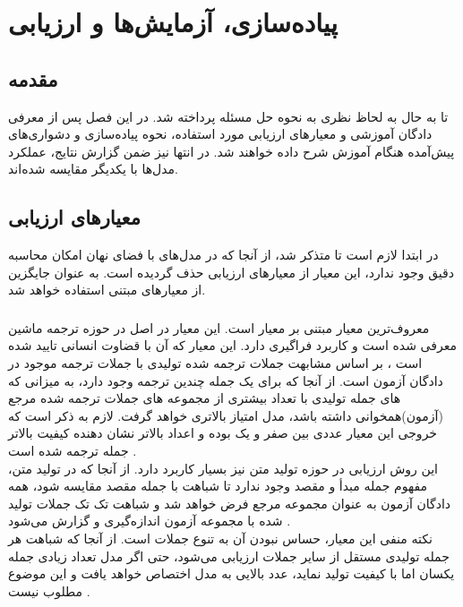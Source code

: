 \chapter{پیاده‌سازی، آزمایش‌ها و ارزیابی}\label{chap4}
\minitoc
\section{مقدمه}
تا به حال به لحاظ نظری به نحوه حل مسئله پرداخته شد. در این فصل پس از معرفی دادگان آموزشی و معیارهای ارزیابی مورد استفاده، نحوه پیاده‌سازی و دشواری‌های پیش‌آمده هنگام آموزش شرح داده خواهند شد. در انتها نیز ضمن گزارش نتایج، عملکرد مدل‌ها با یکدیگر مقایسه شده‌اند.
\section{معیارهای ارزیابی}
در ابتدا لازم است تا متذکر شد، از آنجا که در مدل‌های با فضای نهان امکان محاسبه دقیق \likelihood{} وجود ندارد، این معیار از معیارهای ارزیابی حذف گردیده است. به عنوان جایگزین از معیار‌های مبتنی \ngramphrase{} استفاده خواهد شد.
\subsection{\bleu{}}
معروف‌ترین معیار مبتنی بر \ngramphrase{} معیار \bleu{} است. این معیار در اصل در حوزه ترجمه ماشین معرفی شده است و کاربرد فراگیری دارد. این معیار که 
آن با قضاوت انسانی تایید شده است \cite{bleu}، بر اساس مشابهت \ngramphrase{} جملات ترجمه شده تولیدی با جملات ترجمه موجود در دادگان آزمون است. از آنجا که برای یک جمله چندین ترجمه وجود دارد، به میزانی که \ngramphrase{}‌های جمله تولیدی با تعداد بیشتری از مجموعه \ngram{}‌های جملات ترجمه شده مرجع (آزمون)‌همخوانی داشته باشد، مدل امتیاز بالا‌تری خواهد گرفت. لازم به ذکر است که خروجی این معیار عددی بین صفر و یک بوده و اعداد بالاتر نشان دهنده کیفیت بالاتر جمله ترجمه شده است \cite{bleu}.
\\
این روش ارزیابی در حوزه تولید متن نیز بسیار کاربرد دارد. از آنجا که در تولید متن، مفهوم جمله مبدأ و مقصد وجود ندارد تا شباهت با جمله مقصد مقایسه شود، همه دادگان آزمون به عنوان مجموعه مرجع فرض خواهد شد و شباهت تک تک جملات تولید شده با مجموعه آزمون اندازه‌گیری و گزارش می‌شود \cite{seqgan}.
\\
نکته منفی این معیار، حساس نبودن آن به تنوع جملات است. از آنجا که شباهت هر جمله تولیدی مستقل از سایر جملات ارزیابی می‌شود، حتی اگر مدل تعداد زیادی جمله یکسان اما با کیفیت تولید نماید، عدد بالایی به مدل اختصاص خواهد یافت و این موضوع مطلوب نیست \cite{jointly}.

